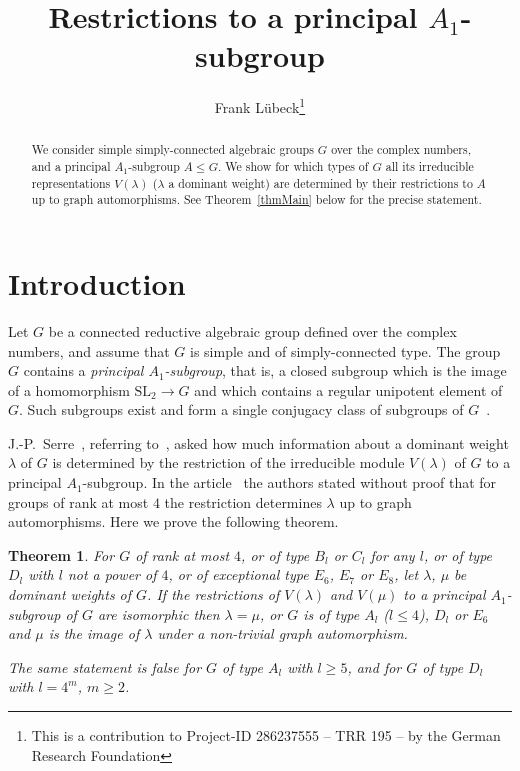 \documentclass[11pt,a4paper]{article}
\theoremstyle{plain}
\newtheorem{Thm}{Theorem}
\theoremstyle{definition}
\newcommand{\SL}{\textrm{SL}}
\begin{document}
\title{Restrictions to a principal $A_1$-subgroup}
\author{Frank Lübeck\thanks{This is a contribution to 
Project-ID 286237555 -- TRR 195 -- by the
German Research Foundation}}
\maketitle
\begin{abstract}
We consider simple simply-connected algebraic groups $G$ over 
the complex numbers, and a principal $A_1$-subgroup $A \leq G$.
We show for which types of $G$ all its irreducible representations
$V(\lambda)$ ($\lambda$ a dominant weight) are determined by 
their restrictions to $A$ up to graph automorphisms. See Theorem~\ref{thmMain} below for 
the precise statement.
\end{abstract}


\section{Introduction}\label{secIntro}

Let $G$ be a connected reductive algebraic group defined over the complex
numbers, and assume that $G$ is simple and of simply-connected type. 
The group $G$ contains a \emph{principal $A_1$-subgroup}, that is, 
a closed subgroup which is the image of a homomorphism $\SL_2 \to G$ and
which contains a regular unipotent element of $G$. Such subgroups exist and
form a single conjugacy class of subgroups of 
$G$~\cite{jacobson,morozov,kostant}.

J.-P.~Serre~\cite{serreA1}, referring to~\cite{npp}, asked  
how much information about a
dominant weight $\lambda$ of $G$ is determined by the restriction of the
irreducible module $V(\lambda)$ of $G$ to a principal $A_1$-subgroup. 
In the article~\cite{npp} the authors stated
without proof that for groups of rank at most $4$ the restriction 
determines $\lambda$ up to graph automorphisms.
Here we prove the following theorem.

\begin{Thm}\label{thmMain}
For $G$ of rank at most $4$, or of type $B_l$ or $C_l$ for any $l$,
or of type $D_l$ with $l$ not a power of $4$,
or of exceptional type $E_6$, $E_7$ or $E_8$, 
let $\lambda$, $\mu$ be dominant weights of $G$. If the restrictions of
$V(\lambda)$ and $V(\mu)$ to a principal $A_1$-subgroup of $G$ are 
isomorphic then $\lambda = \mu$, or $G$ is of type $A_l$ ($l \leq 4$), 
$D_l$ or $E_6$ and $\mu$ is the image of $\lambda$ under a non-trivial graph 
automorphism.

The same statement is false for $G$ of type $A_l$ with $l \geq 5$,
and for $G$ of type $D_l$ with $l = 4^m$, $m \geq 2$.
\end{Thm}
\end{document}
